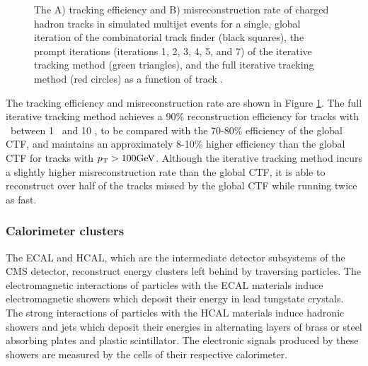 \begin{figure}[htbp]
{  }
  \caption[Track Reconstruction Performance]{The A) tracking efficiency and B) misreconstruction rate of charged hadron tracks in simulated multijet events for a single, global iteration of the combinatorial track finder (black squares), the prompt iterations (iterations 1, 2, 3, 4, 5, and 7) of the iterative tracking method (green triangles), and the full iterative tracking method (red circles) as a function of track \pT.\cite{PARTICLEFLOW}}
    \label{fig:pftrack_perf}
\end{figure}

The tracking efficiency and misreconstruction rate are shown in Figure \ref{fig:pftrack_perf}. The full iterative tracking method achieves a 90\% reconstruction efficiency for tracks with \pT\ between 1 \GeV\ and 10 \GeV, to be compared with the 70-80\% efficiency of the global CTF, and maintains an approximately 8-10\% higher efficiency than the global CTF for tracks with $p_{\mathrm{T}} > 100 \mathrm{GeV}$. Although the iterative tracking method incurs a slightly higher misreconstruction rate than the global CTF, it is able to reconstruct over half of the tracks missed by the global CTF while running twice as fast.

\subsubsection{Calorimeter clusters}

The ECAL and HCAL, which are the intermediate detector subsystems of the CMS detector, reconstruct energy clusters left behind by traversing particles. The electromagnetic interactions of particles with the ECAL materials induce electromagnetic showers which deposit their energy in lead tungstate crystals. The strong interactions of particles with the HCAL materials induce hadronic showers and jets which deposit their energies in alternating layers of brass or steel absorbing plates and plastic scintillator. The electronic signals produced by these showers are measured by the cells of their respective calorimeter.

